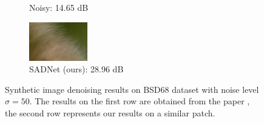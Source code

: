 \begin{figure}[t!]
\begin{subfigure}{0.25\textwidth}
            \caption{Noisy: 14.65 dB}
            \label{fig:bsd_noisy}
        \end{subfigure}\hfil %
        \begin{subfigure}{0.25\textwidth}
            \includegraphics[width=\linewidth]{images/bsd_out.png}
            \caption{SADNet (ours): 28.96 dB}
            \label{fig:bsd_out}
        \end{subfigure}\hfil %
    \caption{Synthetic image denoising results on BSD68 dataset with noise level $\sigma = 50$. The results on the first row are obtained from the paper \cite{10.1007/978-3-030-58577-8_11}, the second row represents our results on a similar patch.}
    \label{fig:kus}
\end{figure}



